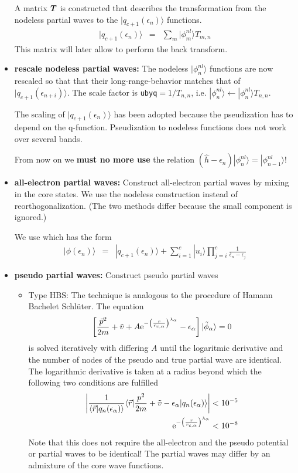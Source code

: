 \documentclass[11pt,a4paper]{report}
\begin{document}
\begin{itemize}
A matrix $\bm{T}$ is constructed that describes the transformation
from the nodeless partial waves to the $|q_{c+1}(\epsilon_n)\rangle$
functions.
\begin{eqnarray*}
|q_{c+1}(\epsilon_n)\rangle&=&\sum_m|\phi^{nl}_m\rangle T_{m,n}
\end{eqnarray*}
This matrix will later allow to perform the back transform.
%
\item \textbf{rescale nodeless partial waves:} The nodeless
  $|\phi^{nl}_n\rangle$ functions are now rescaled so that that their
  long-range-behavior matches that of
  $|q_{c+1}(\epsilon_{n+i})\rangle$. The scale factor is
  \verb|ubyq|$=1/T_{n,n}$,
  i.e. $|\phi^{nl}_n\rangle\leftarrow|\phi^{nl}_n\rangle T_{n,n}$.

  The scaling of $|q_{c+1}(\epsilon_n)\rangle$ has been adopted
  because the pseudization has to depend on the
  q-function. Pseudization to nodeless functions does not work over
  several bands.

  From now on we \textbf{must no more use} the relation
  $(\hat{h}-\epsilon_n)|\phi^{nl}_n\rangle=|\phi^{nl}_{n-1}\rangle$!

\item \textbf{all-electron partial waves:} Construct all-electron
  partial waves by mixing in the core states. We use the nodeless
  construction instead of reorthogonalization. (The two methods differ
  because the small component is ignored.)

  We use  which has the form
  \begin{eqnarray*}
    |\phi(\epsilon_n)\rangle&=& |q_{c+1}(\epsilon_n)\rangle+\sum_{i=1}^{c}
    |u_i\rangle\prod_{j=i}^{c}\frac{1}{\bar{\epsilon}_n-\epsilon_j}
    \label{eq:fromqntophi}
  \end{eqnarray*}
%
\item \textbf{pseudo partial waves:} Construct pseudo partial waves
\begin{itemize}
\item Type HBS: The technique is analogous to the procedure of Hamann
  Bachelet Schl\"uter.
The equation 
\begin{eqnarray*}
\left[\frac{\vec{p}^2}{2m}+\tilde{v}
+ A\mathrm{e}^{-\left(\frac{r}{r_{c,\alpha}}\right)^{\lambda_\alpha}}-\epsilon_\alpha\right]
|\tilde\phi_\alpha\rangle=0
\end{eqnarray*}
is solved iteratively with differing $A$ until the logaritmic
derivative and the number of nodes of the pseudo and true partial wave
are identical. The logarithmic derivative is taken at a radius beyond
which the following two conditions are fulfilled
\begin{eqnarray*}
\left|\frac{1}{\langle\vec{r}|q_n(\epsilon_\alpha)\rangle}
\langle\vec{r}|
\frac{p^2}{2m}+\tilde{v}-\epsilon_\alpha|q_n(\epsilon_\alpha)\rangle\right|
<10^{-5}
\\
\mathrm{e}^{-\left(\frac{r}{r_{c,\alpha}}\right)^{\lambda_\alpha}}<10^{-8}
\end{eqnarray*}
Note that this does not require the all-electron and the pseudo
potential or partial waves to be identical! The partial waves may
differ by an admixture of the core wave functions.


\end{itemize}
\end{itemize}
\end{document}
